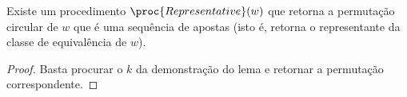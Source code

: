 \begin{corollary}
    Existe um procedimento $\proc{Representative}(w)$
    que retorna a permutação circular de $w$ que é uma sequência de apostas
    (isto é, retorna o representante da classe de equivalência de $w$).
\end{corollary}

\begin{proof}
    Basta procurar o $k$ da demonstração do lema
    e retornar a permutação correspondente.
\end{proof}
